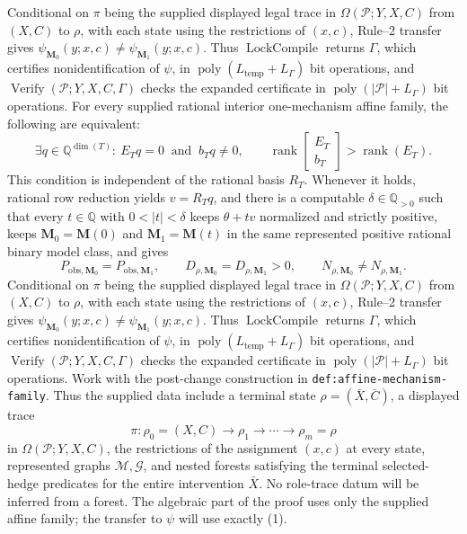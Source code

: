 Conditional on \(\pi\) being the supplied displayed legal trace in \(\Omega(\mathcal P;Y,X,C)\) from \((X,C)\) to \(\rho\), with each state using the restrictions of \((x,c)\), Rule--2 transfer gives \(\psi_{\mathbf M_0}(y;x,c)\neq\psi_{\mathbf M_1}(y;x,c)\).  Thus \(\operatorname{LockCompile}\) returns \(\Gamma\), which certifies nonidentification of \(\psi\), in \(\operatorname{poly}(L_{\mathrm{temp}}+L_{\Gamma})\) bit operations, and \(\operatorname{Verify}(\mathcal P;Y,X,C,\Gamma)\) checks the expanded certificate in \(\operatorname{poly}(|\mathcal P|+L_{\Gamma})\) bit operations.
For every supplied rational interior one-mechanism affine family, the following are equivalent:
\[
 \exists q\in\mathbb Q^{\dim(T)}:\ E_Tq=0\ \text{ and }\ b_Tq\neq0,
 \qquad
 \operatorname{rank}\!\begin{bmatrix}E_T\\ b_T\end{bmatrix}>
 \operatorname{rank}(E_T).
\]
This condition is independent of the rational basis \(R_T\).  Whenever it holds, rational row reduction yields \(v=R_Tq\), and there is a computable \(\delta\in\mathbb Q_{>0}\) such that every \(t\in\mathbb Q\) with \(0<|t|<\delta\) keeps \(\theta+t v\) normalized and strictly positive, keeps \(\mathbf M_0=\mathbf M(0)\) and \(\mathbf M_1=\mathbf M(t)\) in the same represented positive rational binary model class, and gives
\[
 P_{\mathrm{obs},\mathbf M_0}=P_{\mathrm{obs},\mathbf M_1},\qquad
 D_{\rho,\mathbf M_0}=D_{\rho,\mathbf M_1}>0,
 \qquad N_{\rho,\mathbf M_0}\neq N_{\rho,\mathbf M_1}.
\]
Conditional on \(\pi\) being the supplied displayed legal trace in \(\Omega(\mathcal P;Y,X,C)\) from \((X,C)\) to \(\rho\), with each state using the restrictions of \((x,c)\), Rule--2 transfer gives \(\psi_{\mathbf M_0}(y;x,c)\neq\psi_{\mathbf M_1}(y;x,c)\).  Thus \(\operatorname{LockCompile}\) returns \(\Gamma\), which certifies nonidentification of \(\psi\), in \(\operatorname{poly}(L_{\mathrm{temp}}+L_{\Gamma})\) bit operations, and \(\operatorname{Verify}(\mathcal P;Y,X,C,\Gamma)\) checks the expanded certificate in \(\operatorname{poly}(|\mathcal P|+L_{\Gamma})\) bit operations.
Work with the post-change construction in \texttt{def:affine-mechanism-family}.  Thus the supplied data include a terminal state \(\rho=(\bar X,\bar C)\), a displayed trace
\[
 \pi:\rho_0=(X,C)\longrightarrow\rho_1\longrightarrow\cdots
 \longrightarrow\rho_m=\rho                                      \tag{1}
\]
in \(\Omega(\mathcal P;Y,X,C)\), the restrictions of the assignment \((x,c)\) at every state, represented graphs \(\mathcal M,\mathcal G\), and nested forests satisfying the terminal selected-hedge predicates for the entire intervention \(\bar X\).  No role-trace datum will be inferred from a forest.  The algebraic part of the proof uses only the supplied affine family; the transfer to \(\psi\) will use exactly (1).

